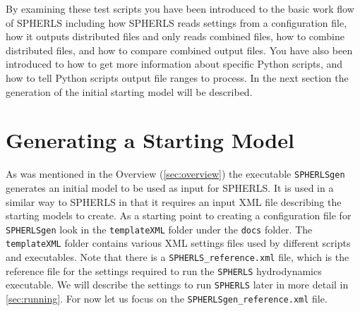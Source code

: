 \documentclass[12pt,a4paper]{book}
\begin{document}
By examining these test scripts you have been introduced to the basic work flow of SPHERLS including how SPHERLS reads settings from a configuration file, how it outputs distributed files and only reads combined files, how to combine distributed files, and how to compare combined output files. You have also been introduced to how to get more information about specific Python scripts, and how to tell Python scripts output file ranges to process. In the next section the generation of the initial starting model will be described.


\section{Generating a Starting Model}
As was mentioned in the Overview (\autoref{sec:overview}) the executable {\tt SPHERLSgen} generates an initial model to be used as input for SPHERLS. It is used in a similar way to SPHERLS in that it requires an input XML file describing the starting models to create. As a starting point to creating a configuration file for {\tt SPHERLSgen} look in the {\tt templateXML} folder under the {\tt docs} folder. The {\tt templateXML} folder contains various XML settings files used by different scripts and executables. Note that there is a {\tt SPHERLS\_reference.xml} file, which is the reference file for the settings required to run the {\tt SPHERLS} hydrodynamics executable. We will describe the settings to run {\tt SPHERLS} later in more detail in \autoref{sec:running}. For now let us focus on the {\tt SPHERLSgen\_reference.xml} file.
\end{document}

